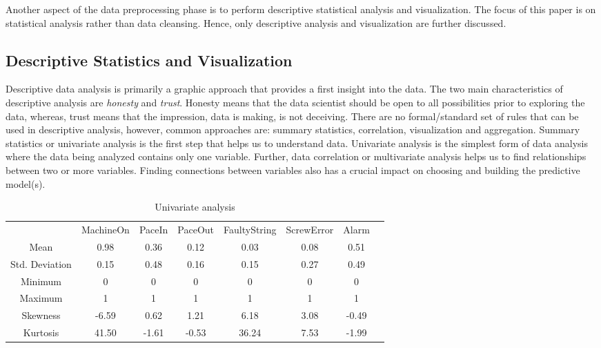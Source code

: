 \documentclass[runningheads]{llncs}
\begin{document}
Another aspect of the data preprocessing phase is to perform descriptive statistical analysis and visualization. The focus of this paper is on statistical analysis rather than data cleansing. Hence, only descriptive analysis and visualization are further discussed.


\subsection{Descriptive Statistics and Visualization }
\label{sec:dataanalysis}
Descriptive data analysis is primarily a graphic approach that provides a first insight into the data. The two main characteristics of descriptive analysis are \emph{honesty} and \emph{trust}. Honesty means that the data scientist should be open to all possibilities prior to exploring the data, whereas, trust means that the impression, data is making, is not deceiving. There are no formal/standard set of rules that can be used in descriptive analysis, however, common approaches are: summary statistics, correlation, visualization and aggregation. Summary statistics or univariate analysis is the first step that helps us to understand data. Univariate analysis is the simplest form of data analysis where the data being analyzed contains only one variable. Further, data correlation or multivariate analysis helps us to find relationships between two or more variables. Finding connections between variables also has a crucial impact on choosing and building the predictive model(s). 

\begin{table}[ht]
\caption{Univariate analysis}
\label{example3}
\centering
\begin{tabular}{cccccccc}
\hline\noalign{\smallskip}
 & MachineOn & PaceIn & PaceOut & FaultyString &  ScrewError & Alarm\\
\noalign{\smallskip}
\hline
\noalign{\smallskip}
Mean & 0.98 & 0.36 & 0.12 & 0.03 & 0.08 & 0.51\\
Std. Deviation & 0.15 & 0.48 & 0.16 & 0.15 & 0.27 & 0.49\\
Minimum & 0 & 0 & 0 & 0 & 0 & 0 \\
Maximum & 1 & 1 & 1 & 1 & 1 & 1\\
Skewness & -6.59  & 0.62 & 1.21  & 6.18   & 3.08 & -0.49\\
Kurtosis & 41.50  & -1.61 & -0.53  & 36.24  & 7.53 & -1.99\\
\hline
\end{tabular}
\end{table}
\end{document}

